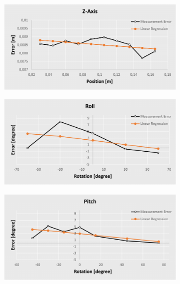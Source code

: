 \begin{figure}[h!]
{\begin{tcolorbox}
\begin{subfigure}[c]{.485\textwidth}
         \centering
         \includegraphics[width=1\textwidth]{Cap5/Figuras/z_correction_asses.pdf}
     \end{subfigure}
     \begin{subfigure}[c]{.485\textwidth}
         \centering
         \includegraphics[width=1\textwidth]{Cap5/Figuras/roll_correction_asses.pdf}
     \end{subfigure}
     \hfill
     \begin{subfigure}[c]{.485\textwidth}
         \centering
         \includegraphics[width=1\textwidth]{Cap5/Figuras/pitch_correction_asses.pdf}

\end{subfigure}
\end{tcolorbox}}
\end{figure}
